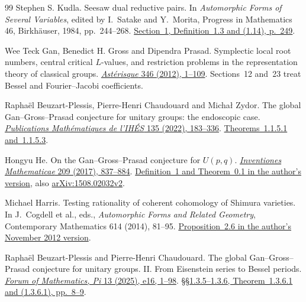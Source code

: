 \begin{thebibliography}{99}
Stephen S. Kudla.
Seesaw dual reductive pairs.
In \emph{Automorphic Forms of Several Variables}, edited by
I.~Satake and Y.~Morita, Progress in Mathematics 46,
Birkh\"auser, 1984, pp.~244--268.
\href{https://wiki.epfl.ch/waldspurger/documents/1984\%20kudla.pdf\#page=3}
{Section~1, Definition~1.3 and (1.14), p.~249}.

Wee Teck Gan, Benedict H. Gross and Dipendra Prasad.
Symplectic local root numbers, central critical \(L\)-values, and
restriction problems in the representation theory of classical groups.
\href{https://www.numdam.org/item/AST_2012__346__1_0/}
{\emph{Ast\'erisque} 346 (2012), 1--109}.
Sections~12 and~23 treat Bessel and Fourier--Jacobi coefficients.

Rapha\"el Beuzart-Plessis, Pierre-Henri Chaudouard and Micha{\l} Zydor.
The global Gan--Gross--Prasad conjecture for unitary groups:
the endoscopic case.
\href{https://www.numdam.org/articles/10.1007/s10240-021-00129-1/}
{\emph{Publications Math\'ematiques de l'IH\'ES} 135 (2022), 183--336}.
\href{https://numdam.org/item/10.1007/s10240-021-00129-1.pdf\#page=3}
{Theorems~1.1.5.1 and~1.1.5.3}.

Hongyu He.
On the Gan--Gross--Prasad conjecture for \(U(p,q)\).
\href{https://doi.org/10.1007/s00222-017-0720-x}
{\emph{Inventiones Mathematicae} 209 (2017), 837--884}.
\href{https://www.math.lsu.edu/~hongyu/pub/ggp_hhe_final.pdf\#page=2}
{Definition~1 and Theorem~0.1 in the author's version},
also \href{https://arxiv.org/abs/1508.02032v2}{arXiv:1508.02032v2}.

Michael Harris.
Testing rationality of coherent cohomology of Shimura varieties.
In J.~Cogdell et al., eds.,
\emph{Automorphic Forms and Related Geometry},
Contemporary Mathematics 614 (2014), 81--95.
\href{https://webusers.imj-prg.fr/~michael.harris/testing.pdf\#page=7}
{Proposition~2.6 in the author's November 2012 version}.

Rapha\"el Beuzart-Plessis and Pierre-Henri Chaudouard.
The global Gan--Gross--Prasad conjecture for unitary groups. II.
From Eisenstein series to Bessel periods.
\href{https://doi.org/10.1017/fmp.2025.8}
{\emph{Forum of Mathematics, Pi} 13 (2025), e16, 1--98}.
\href{https://www.cambridge.org/core/services/aop-cambridge-core/content/view/2E9DFB9FC7A671B5530E47E3A37D1E7E/S2050508625000083a.pdf/global_gangrossprasad_conjecture_for_unitary_groups_ii_from_eisenstein_series_to_bessel_periods.pdf\#page=9}
{\S\S1.3.5--1.3.6, Theorem~1.3.6.1 and (1.3.6.1), pp.~8--9}.


\end{thebibliography}
